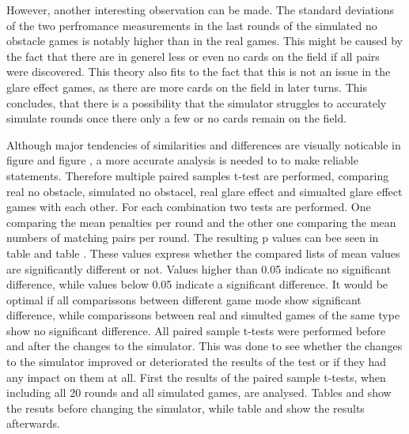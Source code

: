However, another interesting observation can be made. The standard deviations of the two perfromance measurements in the last rounds of the simulated no obstacle games is notably higher than in the real games. This might be caused by the fact that there are in generel less or even no cards on the field if all pairs were discovered. This theory also fits to the fact that this is not an issue in the glare effect games, as there are more cards on the field in later turns. This concludes, that there is a possibility that the simulator struggles to accurately simulate rounds once there only a few or no cards remain on the field. 

Although major tendencies of similarities and differences are visually noticable in figure  and figure , a more accurate analysis is needed to to make reliable statements. Therefore multiple paired samples t-test are performed, comparing real no obstacle, simulated no obstacel, real glare effect and simualted glare effect games with each other. For each combination two tests are performed. One comparing the mean penalties per round and the other one comparing the mean numbers of matching pairs per round. The resulting p values can bee seen in table  and table . These values express whether the compared lists of mean values are significantly different or not. Values higher than 0.05 indicate no significant difference, while values below 0.05 indicate a significant difference. It would be optimal if all comparissons between different game mode show significant difference, while comparissons between real and simulted games of the same type show no significant difference. All paired sample t-tests were performed before and after the changes to the simulator. This was done to see whether the changes to the simulator improved or deteriorated the results of the test or if they had any impact on them at all. First the results of the paired sample t-tests, when including all 20 rounds and all simulated games, are analysed. Tables  and  show the resuts before changing the simulator, while table  and  show the results afterwards.


